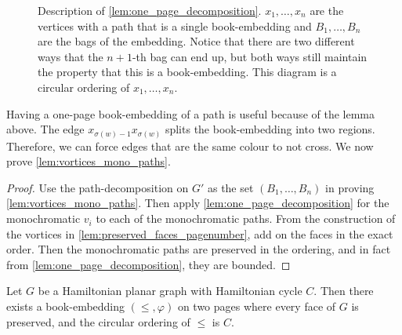 \begin{figure}[h!]
	\centering
	
	\caption[One-page decomposition]{Description of \cref{lem:one_page_decomposition}. \(x_1, \ldots, x_n\) are the vertices with a path that is a single book-embedding and \(B_1, \ldots, B_n\) are the bags of the embedding. Notice that there are two different ways that the \(n + 1\)-th bag can end up, but both ways still maintain the property that this is a book-embedding. This diagram is a circular ordering of \(x_1, \ldots, x_n\).}\label{fig:preserving_pages}
\end{figure}
Having a one-page book-embedding of a path is useful because of the lemma above. The edge $x_{\sigma(w)-1} x_{\sigma(w)}$ splits the book-embedding into two regions. Therefore, we can force edges that are the same colour to not cross. 
We now prove \cref{lem:vortices_mono_paths}.
\begin{proof}
	Use the path-decomposition on \(G'\) as the set \((B_1, \ldots , B_n)\) in proving \cref{lem:vortices_mono_paths}. Then apply \cref{lem:one_page_decomposition} for the monochromatic \(v_i\) to each of the monochromatic paths. From the construction of the vortices in \cref{lem:preserved_faces_pagenumber}, add on the faces in the exact order. Then the monochromatic paths are preserved in the ordering, and in fact from \cref{lem:one_page_decomposition}, they are bounded.
\end{proof}
\begin{lemma}\label{lem:Hamiltonian_preserved_faces}
	Let \(G\) be a Hamiltonian planar graph with Hamiltonian cycle $C$. Then there exists a book-embedding $(\leq, \varphi)$ on two pages where every face of $G$ is preserved, and the circular ordering of $\leq$ is $C$.
\end{lemma}

